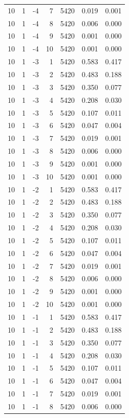 \begin{table}
\begin{tabular}{rrrrrrr}
10 & 1 & -4 & 7 & 5420 & 0.019 & 0.001 \\
10 & 1 & -4 & 8 & 5420 & 0.006 & 0.000 \\
10 & 1 & -4 & 9 & 5420 & 0.001 & 0.000 \\
10 & 1 & -4 & 10 & 5420 & 0.001 & 0.000 \\
10 & 1 & -3 & 1 & 5420 & 0.583 & 0.417 \\
10 & 1 & -3 & 2 & 5420 & 0.483 & 0.188 \\
10 & 1 & -3 & 3 & 5420 & 0.350 & 0.077 \\
10 & 1 & -3 & 4 & 5420 & 0.208 & 0.030 \\
10 & 1 & -3 & 5 & 5420 & 0.107 & 0.011 \\
10 & 1 & -3 & 6 & 5420 & 0.047 & 0.004 \\
10 & 1 & -3 & 7 & 5420 & 0.019 & 0.001 \\
10 & 1 & -3 & 8 & 5420 & 0.006 & 0.000 \\
10 & 1 & -3 & 9 & 5420 & 0.001 & 0.000 \\
10 & 1 & -3 & 10 & 5420 & 0.001 & 0.000 \\
10 & 1 & -2 & 1 & 5420 & 0.583 & 0.417 \\
10 & 1 & -2 & 2 & 5420 & 0.483 & 0.188 \\
10 & 1 & -2 & 3 & 5420 & 0.350 & 0.077 \\
10 & 1 & -2 & 4 & 5420 & 0.208 & 0.030 \\
10 & 1 & -2 & 5 & 5420 & 0.107 & 0.011 \\
10 & 1 & -2 & 6 & 5420 & 0.047 & 0.004 \\
10 & 1 & -2 & 7 & 5420 & 0.019 & 0.001 \\
10 & 1 & -2 & 8 & 5420 & 0.006 & 0.000 \\
10 & 1 & -2 & 9 & 5420 & 0.001 & 0.000 \\
10 & 1 & -2 & 10 & 5420 & 0.001 & 0.000 \\
10 & 1 & -1 & 1 & 5420 & 0.583 & 0.417 \\
10 & 1 & -1 & 2 & 5420 & 0.483 & 0.188 \\
10 & 1 & -1 & 3 & 5420 & 0.350 & 0.077 \\
10 & 1 & -1 & 4 & 5420 & 0.208 & 0.030 \\
10 & 1 & -1 & 5 & 5420 & 0.107 & 0.011 \\
10 & 1 & -1 & 6 & 5420 & 0.047 & 0.004 \\
10 & 1 & -1 & 7 & 5420 & 0.019 & 0.001 \\
10 & 1 & -1 & 8 & 5420 & 0.006 & 0.000 \\

\end{tabular}
\end{table}
